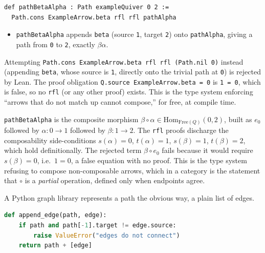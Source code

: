 \begin{lstlisting}
def pathBetaAlpha : Path exampleQuiver 0 2 :=
  Path.cons ExampleArrow.beta rfl rfl pathAlpha
\end{lstlisting}

\begin{itemize}
\tightlist
\item
  \texttt{pathBetaAlpha} appends \texttt{beta} (source \texttt{1}, target \texttt{2}) onto \texttt{pathAlpha}, giving a path from \texttt{0} to \texttt{2}, exactly \(\beta\alpha\).
\end{itemize}

Attempting \texttt{Path.cons ExampleArrow.beta rfl rfl (Path.nil 0)} instead (appending \texttt{beta}, whose source is \texttt{1}, directly onto the trivial path at \texttt{0}) is rejected by Lean. The proof obligation \texttt{Q.source ExampleArrow.beta = 0} is \texttt{1 = 0}, which is false, so no \texttt{rfl} (or any other proof) exists. This is the type system enforcing ``arrows that do not match up cannot compose,'' for free, at compile time.

\begin{mathreading}

\texttt{pathBetaAlpha} is the composite morphism \(\beta\circ\alpha \in \mathrm{Hom}_{\mathrm{Free}(Q)}(0,2)\), built as \(e_0\) followed by \(\alpha : 0\to 1\) followed by \(\beta : 1\to 2\). The \texttt{rfl} proofs discharge the composability side-conditions \(s(\alpha)=0\), \(t(\alpha)=1\), \(s(\beta)=1\), \(t(\beta)=2\), which hold definitionally. The rejected term \(\beta\circ e_0\) fails because it would require \(s(\beta) = 0\), i.e.~\(1 = 0\), a false equation with no proof. This is the type system refusing to compose non-composable arrows, which in a category is the statement that \(\circ\) is a \emph{partial} operation, defined only when endpoints agree.

\end{mathreading}

\begin{progcorner}

A Python graph library represents a path the obvious way, a plain list of edges.

\end{progcorner}

\begin{lstlisting}[language=Python,style=python]
def append_edge(path, edge):
    if path and path[-1].target != edge.source:
        raise ValueError("edges do not connect")
    return path + [edge]
\end{lstlisting}

